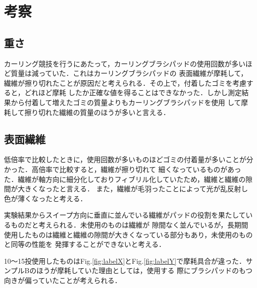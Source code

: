 \documentclass[main]{subfiles}
\begin{document}
\chapter{考察}
\section{重さ}
カーリング競技を行うにあたって，カーリングブラシパッドの使用回数が多いほど質量は減っていた．これはカーリングブラシパッドの
表面繊維が摩耗して，繊維が擦り切れたことが原因だと考えられる．その上で，付着したゴミを考慮すると，どれほど摩耗
したか正確な値を得ることはできなかった．しかし測定結果から付着して増えたゴミの質量よりもカーリングブラシパッドを使用
して摩耗して擦り切れた繊維の質量のほうが多いと言える．
\\

\section{表面繊維}
低倍率で比較したときに，使用回数が多いものほどゴミの付着量が多いことが分かった．高倍率で比較すると，繊維が擦り切れて
細くなっているものがあった．繊維が軸方向に細分化しておりフィブリル化していたため，繊維と繊維の隙間が大きくなったと言える．
また，繊維が毛羽ったことによって光が乱反射し色が薄くなったと考える．

実験結果からスイープ方向に垂直に並んでいる繊維がパッドの役割を果たしているものだと考えられる．未使用のものは繊維が
隙間なく並んでいるが，長期間使用したものは繊維と繊維の隙間が大きくなっている部分もあり，未使用のものと同等の性能を
発揮することができないと考える．

10～15投使用したものはFig.\ref{fig:labelX}とFig.\ref{fig:labelY}で摩耗具合が違った．サンプルBのほうが摩耗していた理由としては，使用する
際にブラシパッドのもつ向きが偏っていたことが考えられる．
\end{document}
